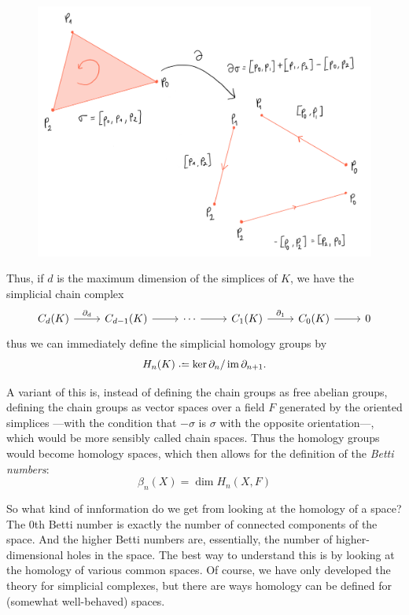 \documentclass[../main.tex]{subfiles}
\begin{document}
\begin{figure}[htb]
	\centering
	\includegraphics[width = 12cm]{figs/boundary}
	\label{fig:boundary}
\end{figure}

Thus, if \( d \) is the maximum dimension of the simplices of \( K \), we have the
simplicial chain complex
\begin{equation*}
	\begin{tikzcd}
		C_d(K) \arrow[r, "\partial_d"] & C_{d-1}(K) \arrow[r] & \cdots \arrow[r] & C_1(K)
		\arrow[r, "\partial_1"] & C_0(K) \arrow[r] & 0 
	\end{tikzcd}
\end{equation*}
thus we can immediately define the simplicial homology groups by
\begin{equation*}
	H_n(K) \defeq \ker \partial_n / \im \partial_{n+1}. 
\end{equation*}

A variant of this is, instead of defining the chain groups as free abelian groups,
defining the chain groups as vector spaces over a field \( F \) generated by the oriented
simplices ---with the condition that \( -\sigma \) is \( \sigma \) with the opposite
orientation---, which would be more sensibly called chain spaces. Thus the homology groups
would become homology spaces, which then allows for the definition of the \emph{Betti
numbers}:
\begin{equation*}
	\beta_n(X) = \dim H_n(X, F)
\end{equation*}

So what kind of innformation do we get from looking at the homology of a space?
The 0th Betti number is exactly the number of connected
components of the space. And the higher Betti numbers are, essentially, the number of
higher-dimensional holes in the space. The best way to understand this is by looking at the
homology of various common spaces. Of course, we have only developed the theory for
simplicial complexes, but there are ways homology can be defined for (somewhat
well-behaved) spaces. 
\end{document}

